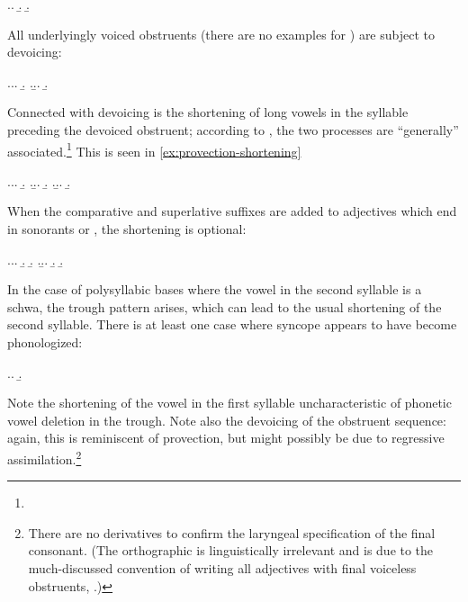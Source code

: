 \ex.\a.
\b.
\b.


All underlyingly voiced obstruents (there are no examples for \ipa{[ʒ]}) are subject to devoicing:

\ex.\a.\a.
\b.
\z.\b.\a.
\b.


Connected with devoicing is the shortening of long vowels in the syllable preceding the devoiced obstruent; according to \citet[p.~267]{humphreys95:_phonol_bothoa_saint_nicol_pelem}, the two processes are \enquote{generally} associated.\footnote{} This is seen in \cref{ex:provection-shortening}

\ex.\label{ex:provection-shortening}\a.\a.
\b.
\z.\b.\a.
\b.
\z.\b.\a.
\b.

When the comparative and superlative suffixes are added to adjectives which end in sonorants or , the shortening is optional:

\ex.\a.\a.
\b.
\b.\mbi{[ˈbɛrɒh]}
\z.\b.\a.
\b.
\b.\mbi{[ˈvilɒh]}


In the case of polysyllabic bases where the vowel in the second syllable is a schwa, the trough pattern arises, which can lead to the usual shortening of the second syllable. There is at least one case where syncope appears to have become phonologized:

\ex.\a.
\b.

Note the shortening of the vowel in the first syllable uncharacteristic of phonetic vowel deletion in the trough. Note also the devoicing of the obstruent sequence: again, this is reminiscent of provection, but might possibly be due to regressive assimilation.\footnote{There are no derivatives to confirm the laryngeal specification of the final consonant. (The orthographic \ipa{[t]} is linguistically irrelevant and is due to the much-discussed convention of writing all adjectives with final voiceless obstruents, \citealp[\cf][]{wmffre07_2}.)}

